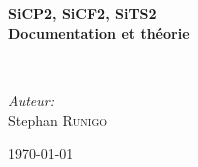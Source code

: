 \begin{titlepage}
\begin{center}
\textsc{\Large }\\[0.5cm]

\HRule \\[0.4cm]

{\huge \bfseries  SiCP2, SiCF2, SiTS2\\
Documentation et théorie\\[0.4cm] }

\HRule \\[1.5cm]

\begin{minipage}{0.4\textwidth}
\begin{flushleft} \large
\end{flushleft}
\end{minipage}
\begin{minipage}{0.4\textwidth}
\begin{flushright} \large
\emph{Auteur:}\\
Stephan \textsc{Runigo}
\end{flushright}
\end{minipage}

\vfill

{\large \today}

\end{center}
\end{titlepage}
